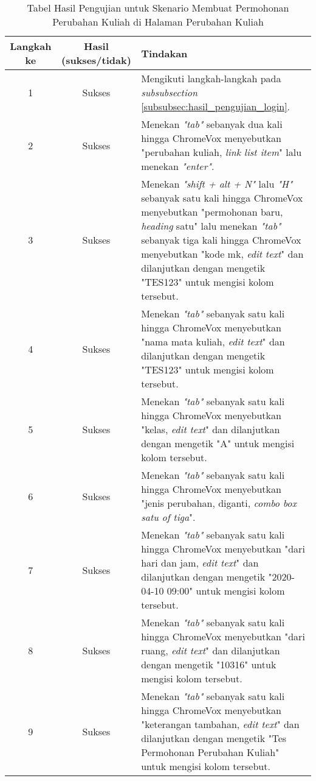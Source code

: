 \begin{table}[H]
    \centering 
    \caption{Tabel Hasil Pengujian untuk Skenario Membuat Permohonan Perubahan Kuliah di Halaman Perubahan Kuliah}
    \label{tab:hasil_pengujian_membuat_permohonan_perubahan_kuliah_di_halaman_perubahan_kuliah}
    \begin{tabular}{|c|c|p{10cm}|}
        \toprule
        Langkah ke & Hasil (sukses/tidak) & Tindakan \\

        \midrule
        1 & Sukses & Mengikuti langkah-langkah pada \textit{subsubsection} \ref{subsubsec:hasil_pengujian_login}. \\
        2 & Sukses & Menekan \textit{"tab"} sebanyak dua kali hingga ChromeVox menyebutkan "perubahan kuliah, \textit{link list item}" lalu menekan \textit{"enter"}. \\
        3 & Sukses & Menekan \textit{"shift + alt + N"} lalu \textit{"H"} sebanyak satu kali hingga ChromeVox menyebutkan "permohonan baru, \textit{heading} satu" lalu menekan \textit{"tab"} sebanyak tiga kali hingga ChromeVox menyebutkan "kode mk, \textit{edit text}" dan dilanjutkan dengan mengetik "TES123" untuk mengisi kolom tersebut. \\
        4 & Sukses & Menekan \textit{"tab"} sebanyak satu kali hingga ChromeVox menyebutkan "nama mata kuliah, \textit{edit text}" dan dilanjutkan dengan mengetik "TES123" untuk mengisi kolom tersebut. \\
        5 & Sukses & Menekan \textit{"tab"} sebanyak satu kali hingga ChromeVox menyebutkan "kelas, \textit{edit text}" dan dilanjutkan dengan mengetik "A" untuk mengisi kolom tersebut. \\
        6 & Sukses & Menekan \textit{"tab"} sebanyak satu kali hingga ChromeVox menyebutkan "jenis perubahan, diganti, \textit{combo box satu of tiga}". \\
        7 & Sukses & Menekan \textit{"tab"} sebanyak satu kali hingga ChromeVox menyebutkan "dari hari dan jam, \textit{edit text}" dan dilanjutkan dengan mengetik "2020-04-10 09:00" untuk mengisi kolom tersebut. \\
        8 & Sukses & Menekan \textit{"tab"} sebanyak satu kali hingga ChromeVox menyebutkan "dari ruang, \textit{edit text}" dan dilanjutkan dengan mengetik "10316" untuk mengisi kolom tersebut. \\
        9 & Sukses & Menekan \textit{"tab"} sebanyak satu kali hingga ChromeVox menyebutkan "keterangan tambahan, \textit{edit text}" dan dilanjutkan dengan mengetik "Tes Permohonan Perubahan Kuliah" untuk mengisi kolom tersebut. \\

\end{tabular}
\end{table}
